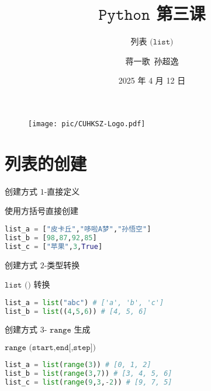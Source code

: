 \documentclass{beamer}
\title{$\texttt{Python}$ 第三课}
\subtitle{列表 $\texttt{(list)}$}
\institute{香港中文大学(深圳) \ 数据科学学院}
\date{2025 年 4 月 12 日}
\author{蒋一歌\ 孙超逸}
\begin{document}
\kaishu
\begin{frame}
    \titlepage
    \begin{figure}[htpb]
        \begin{center}
            \texttt{[image: pic/CUHKSZ-Logo.pdf]}
        \end{center}
    \end{figure}
\end{frame}



\section{列表的创建}

\begin{frame}[fragile]{创建方式 $1$-直接定义}
\begin{exampleblock}{使用方括号直接创建}
\begin{lstlisting}[language=Python]
list_a = ["皮卡丘","哆啦A梦","孙悟空"]
list_b = [98,87,92,85] 
list_c = ["苹果",3,True]
\end{lstlisting}
\end{exampleblock}

\end{frame}

\begin{frame}[fragile]{创建方式 $2$-类型转换}
\begin{exampleblock}{$\texttt{list ()}$ 转换}
\begin{lstlisting}[language=Python]
list_a = list("abc") # ['a', 'b', 'c']
list_b = list((4,5,6)) # [4, 5, 6]
\end{lstlisting}
\end{exampleblock}

\end{frame}

\begin{frame}[fragile]{创建方式 $3$- $\texttt{range}$ 生成}
\begin{exampleblock}{$\texttt{range (start,end[,step])}$}
\begin{lstlisting}[language=Python]
list_a = list(range(3)) # [0, 1, 2]
list_b = list(range(3,7)) # [3, 4, 5, 6]
list_c = list(range(9,3,-2)) # [9, 7, 5]
\end{lstlisting}
\end{exampleblock}

\end{frame}
\end{document}
